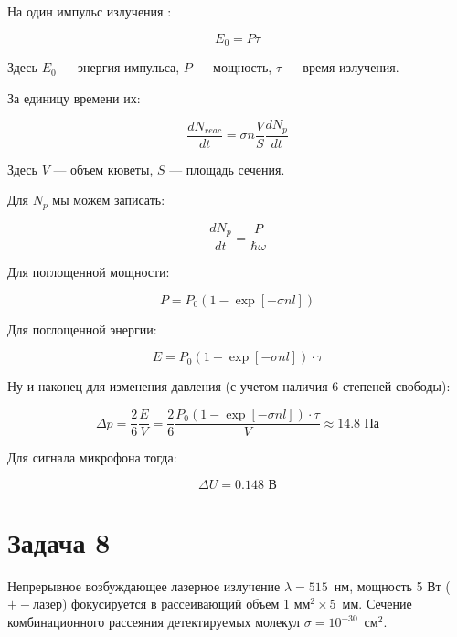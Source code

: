 \documentclass[a4paper, 12pt]{article}
\begin{document}
На один импульс излучения :

\begin{equation}
	E_0 = P \tau
\end{equation}

Здесь $E_0$ --- энергия импульса, $P$ --- мощность, $\tau$ --- время излучения.

За единицу времени их:

\begin{equation}
	\frac{dN_{reac}}{dt} = \sigma n \frac{V}{S} \frac{d N_p}{dt} 
\end{equation}

Здесь $V$ --- объем кюветы, $S$ --- площадь сечения.

Для $N_p$ мы можем записать:

\begin{equation}
	\frac{d N_p}{dt} = \frac{P}{\hbar \omega}
\end{equation}

Для поглощенной мощности:

\begin{equation}
	P = P_0 (1 - \exp [-\sigma n l])
\end{equation}

Для поглощенной энергии:

\begin{equation}
	E = P_0 (1 - \exp [-\sigma n l]) \cdot \tau
\end{equation}

Ну и наконец для изменения давления (с учетом наличия 6 степеней свободы):

\begin{equation}
	\Delta p = \frac{2}{6} \frac{E}{V} = \frac{2}{6} \frac{P_0 (1 - \exp [-\sigma n l]) \cdot \tau}{V} \approx 14.8 \text{ Па}
\end{equation}

Для сигнала микрофона тогда:

\begin{equation}
	\Delta U = 0.148 \text{ В}
\end{equation}

\section*{Задача 8}

Непрерывное возбуждающее лазерное излучение $\lambda = 515$~нм, мощность 5 Вт ($+-$лазер) фокусируется в рассеивающий объем 1 мм$^2 \times$5~мм. Сечение комбинационного рассеяния детектируемых молекул $\sigma = 10^{-30}$~см$^2$.
\end{document}
